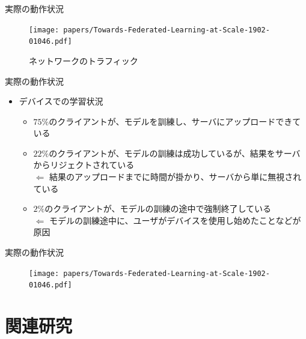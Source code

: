 \documentclass[dvipdfmx,notheorems,t]{beamer}
\begin{document}
\begin{frame}{実際の動作状況}

\begin{figure}
	\centering
	\texttt{[image: papers/Towards-Federated-Learning-at-Scale-1902-01046.pdf]}
	\caption{ネットワークのトラフィック~\cite{DBLP:journals/corr/abs-1902-01046}}
	\label{fig:server-network-traffic}
\end{figure}

\end{frame}

\begin{frame}{実際の動作状況}

\begin{itemize}
	\item デバイスでの学習状況
	\begin{itemize}
		\item $75\%$のクライアントが、モデルを訓練し、サーバにアップロードできている
		\newline
		
		\item $22\%$のクライアントが、モデルの訓練は成功しているが、結果をサーバからリジェクトされている \\
		$\Leftarrow$ 結果のアップロードまでに時間が掛かり、サーバから単に無視されている
		\newline
		
		\item $2\%$のクライアントが、モデルの訓練の途中で強制終了している \\
		$\Leftarrow$ モデルの訓練途中に、ユーザがデバイスを使用し始めたことなどが原因
	\end{itemize}
\end{itemize}

\end{frame}

\begin{frame}{実際の動作状況}

\begin{figure}
	\centering
	\texttt{[image: papers/Towards-Federated-Learning-at-Scale-1902-01046.pdf]}
	\label{fig:on-device-training-round-sessions}
\end{figure}

\end{frame}

\section{関連研究}
\end{document}
